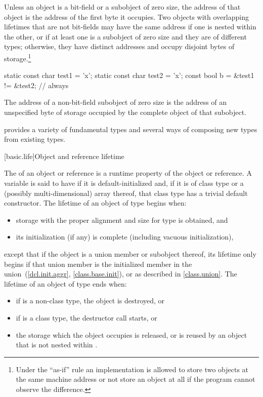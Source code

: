 \pnum
{}%
%
Unless an object is a bit-field or a subobject of zero size, the
address of that object is the address of the first byte it occupies.
Two objects
with overlapping lifetimes
that are not bit-fields
may have the same address
if one is nested within the other,
or
if at least one is a subobject of zero size
and they are of different types;
otherwise, they have distinct addresses
and occupy disjoint bytes of storage.\footnote{Under the ``as-if'' rule an
implementation is allowed to store two objects at the same machine address or
not store an object at all if the program cannot observe the
difference.}
\begin{example}
\begin{codeblock}
static const char test1 = 'x';
static const char test2 = 'x';
const bool b = &test1 != &test2;        // always 
\end{codeblock}
\end{example}
The address of a non-bit-field subobject of zero size is
the address of an unspecified byte of storage
occupied by the complete object of that subobject.

\pnum
\begin{note}
\Cpp{} provides a variety of fundamental types and several ways of composing
new types from existing types.
\end{note}

[basic.life]{Object and reference lifetime}

\pnum
{}%
The  of an object or reference is a runtime property of the
object or reference.
%
A variable is said to have 
if it is default-initialized and,
if it is of class type or a (possibly multi-dimensional) array thereof,
that class type has a trivial default constructor.
The lifetime of an object of type  begins when:
\begin{itemize}
\item storage with the proper alignment and size
  for type  is obtained, and
\item its initialization (if any) is complete
  (including vacuous initialization),
\end{itemize}
except that if the object is a union member or subobject thereof,
its lifetime only begins if that union member is the
initialized member in the union~(\ref{dcl.init.aggr}, \ref{class.base.init}),
or as described in \ref{class.union}.
The lifetime of an object  of type  ends when:
\begin{itemize}
\item if  is a non-class type, the object is destroyed, or
\item if  is a class type, the destructor call starts, or
\item the storage which the object occupies is released,
or is reused by an object that is not nested within .
\end{itemize}

